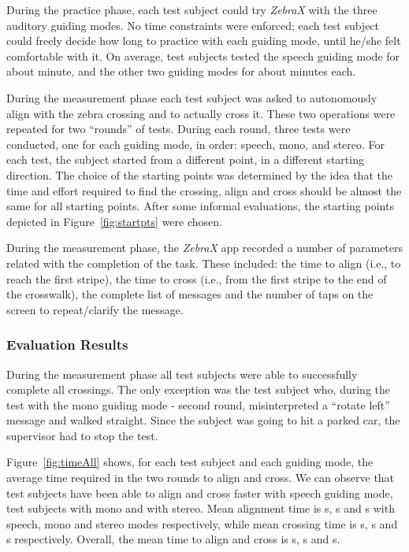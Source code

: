 \documentclass{article}
\newcommand{\zebra}{\emph{ZebraX}}
\begin{document}
During the practice phase, each test subject could try \zebra{} with the three auditory guiding modes.
No time constraints were enforced; each test subject could freely decide how long to practice with each guiding mode, until he/she felt comfortable with it. On average, test subjects tested the speech guiding mode for about  minute, and the other two guiding modes for about  minutes each.

During the measurement phase each test subject was asked to autonomously align with the zebra crossing and to actually cross it.
These two operations were repeated for two ``rounds'' of tests. During each round, three tests were conducted, one for each guiding mode, in order: speech, mono, and stereo.
For each test, the subject started from a different point, in a different starting direction.
The choice of the starting points was determined by the idea that the time and effort required to find the crossing, align and cross should be almost the same for all starting points. After some informal evaluations, the  starting points depicted in Figure~\ref{fig:startpts} were chosen.

During the measurement phase, the \zebra{} app recorded a number of parameters related with the completion of the task. These included: the time to align (i.e., to reach the first stripe), the time to cross (i.e., from the first stripe to the end of the crosswalk), the complete list of messages and the number of taps on the screen to repeat/clarify the message.

\subsubsection{Evaluation Results}
\label{sub:quantitativeResults}
During the measurement phase all test subjects were able to successfully complete all crossings. The only exception was the test subject  who, during the test with the mono guiding mode - second round, misinterpreted a ``rotate left'' message and walked straight. Since the subject was going to hit a parked car, the supervisor had to stop the test.

Figure~\ref{fig:timeAll} shows, for each test subject and each guiding mode, the average time required in the two rounds to align and cross.
We can observe that  test subjects have been able to align and cross faster with speech guiding mode,  test subjects with mono and  with stereo.
Mean alignment time is s, s and s with speech, mono and stereo modes respectively, while mean crossing time is s, s and s respectively.
Overall, the mean time to align and cross is s, s and s.
\end{document}
